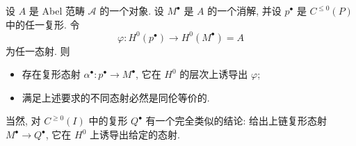 \begin{lemma}\label{lem:6.3-lift-resolution}
设 $A$ 是 Abel 范畴 $\mathcal{A}$ 的一个对象. 设 $M^\bullet$ 是 $A$ 的一个消解, 并设 $p^\bullet$ 是 $C^{\leq 0}(P)$ 中的任一复形. 令
\[
\varphi:H^0(p^\bullet)\longrightarrow H^0(M^\bullet)=A
\]
为任一态射. 则

\begin{itemize}
\item 存在复形态射 $\alpha^\bullet:p^\bullet\to M^\bullet$, 它在 $H^0$ 的层次上诱导出 $\varphi$;
\item 满足上述要求的不同态射必然是同伦等价的.
\end{itemize}

\noindent 当然, 对 $C^{\geq 0}(I)$ 中的复形 $Q^\bullet$ 有一个完全类似的结论: 给出上链复形态射 $M^\bullet\to Q^\bullet$, 它在 $H^0$ 上诱导出给定的态射.
\end{lemma}

